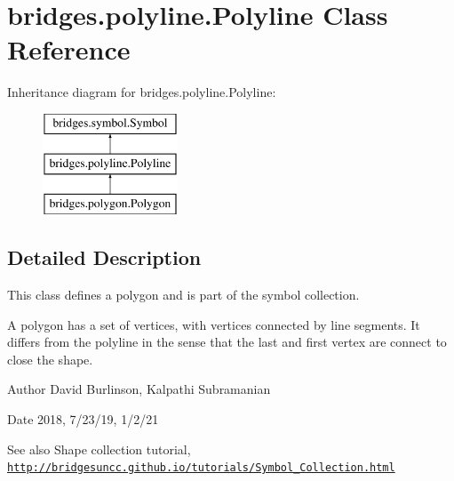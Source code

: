 \hypertarget{classbridges_1_1polyline_1_1_polyline}{}\section{bridges.\+polyline.\+Polyline Class Reference}
\label{classbridges_1_1polyline_1_1_polyline}
Inheritance diagram for bridges.\+polyline.\+Polyline\+:\begin{figure}[H]
\begin{center}
\leavevmode
\includegraphics[height=3.000000cm]{classbridges_1_1polyline_1_1_polyline}
\end{center}
\end{figure}


\subsection{Detailed Description}
This class defines a polygon and is part of the symbol collection. 

A polygon has a set of vertices, with vertices connected by line segments. It differs from the polyline in the sense that the last and first vertex are connect to close the shape.

\begin{DoxyAuthor}{Author}
David Burlinson, Kalpathi Subramanian
\end{DoxyAuthor}
\begin{DoxyDate}{Date}
2018, 7/23/19, 1/2/21
\end{DoxyDate}
\begin{DoxySeeAlso}{See also}
Shape collection tutorial, \href{http://bridgesuncc.github.io/tutorials/Symbol_Collection.html}{\tt http\+://bridgesuncc.\+github.\+io/tutorials/\+Symbol\+\_\+\+Collection.\+html} 
\end{DoxySeeAlso}
